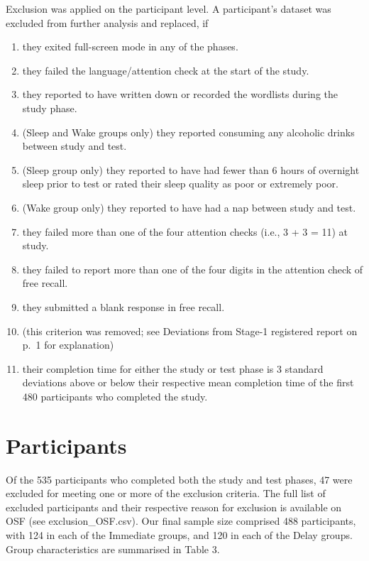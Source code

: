\documentclass[
]{article}
\begin{document}
Exclusion was applied on the participant level. A participant's dataset was excluded from further analysis and replaced, if

\begin{enumerate}
\def\labelenumi{\arabic{enumi}.}
\item
  they exited full-screen mode in any of the phases.
\item
  they failed the language/attention check at the start of the study.
\item
  they reported to have written down or recorded the wordlists during the study phase.
\item
  (Sleep and Wake groups only) they reported consuming any alcoholic drinks between study and test.
\item
  (Sleep group only) they reported to have had fewer than 6 hours of overnight sleep prior to test or rated their sleep quality as poor or extremely poor.
\item
  (Wake group only) they reported to have had a nap between study and test.
\item
  they failed more than one of the four attention checks (i.e., 3 + 3 = 11) at study.
\item
  they failed to report more than one of the four digits in the attention check of free recall.
\item
  they submitted a blank response in free recall.
\item
  (this criterion was removed; see Deviations from Stage-1 registered report on p.~1 for explanation)
\item
  their completion time for either the study or test phase is 3 standard deviations above or below their respective mean completion time of the first 480 participants who completed the study.
\end{enumerate}

\hypertarget{participants}{%
\section{Participants}\label{participants}}

Of the 535 participants who completed both the study and test phases, 47 were excluded for meeting one or more of the exclusion criteria. The full list of excluded participants and their respective reason for exclusion is available on OSF (see exclusion\_OSF.csv). Our final sample size comprised 488 participants, with 124 in each of the Immediate groups, and 120 in each of the Delay groups. Group characteristics are summarised in Table 3.
\end{document}
